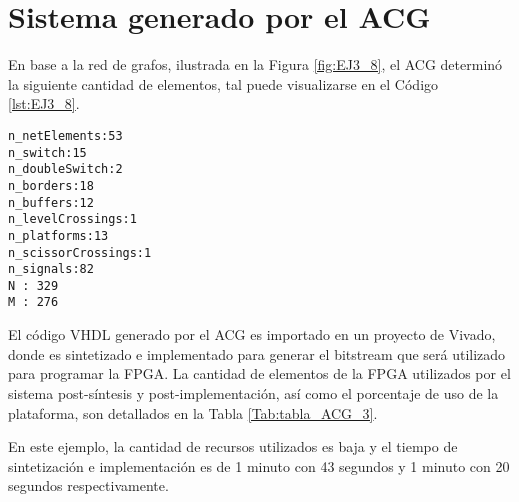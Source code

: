 \section{Sistema generado por el ACG}

En base a la red de grafos, ilustrada en la Figura \ref{fig:EJ3_8}, el ACG determinó la siguiente cantidad de elementos, tal puede visualizarse en el Código \ref{lst:EJ3_8}.

\begin{lstlisting}[language = {}, caption = Cantidad de elementos a implementar por el ACG, label = {lst:EJ3_8}]
n_netElements:53
n_switch:15
n_doubleSwitch:2
n_borders:18
n_buffers:12
n_levelCrossings:1
n_platforms:13
n_scissorCrossings:1
n_signals:82
N : 329
M : 276
\end{lstlisting}

El código VHDL generado por el ACG es importado en un proyecto de Vivado, donde es sintetizado e implementado para generar el bitstream que será utilizado para programar la FPGA. La cantidad de elementos de la FPGA utilizados por el sistema post-síntesis y post-implementación, así como el porcentaje de uso de la plataforma, son detallados en la Tabla \ref{Tab:tabla_ACG_3}.

\begin{table}[H]
	{
		\caption{Síntesis e implementación del ejemplo 3 generado por el ACG.}
		\label{Tab:tabla_ACG_3}
		\centering
		\begin{center}
		\end{center}
	}    
\end{table}

En este ejemplo, la cantidad de recursos utilizados es baja y el tiempo de sintetización e implementación es de 1 minuto con 43 segundos y 1 minuto con 20 segundos respectivamente.